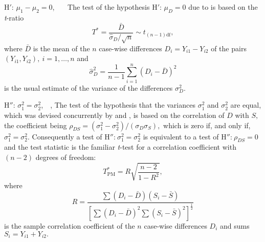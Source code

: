 \documentclass[a4]{beamer}
\begin{document}
\begin{frame}
 \begin{exampleblock}{H$'$: $\mu_1-\mu_2=0$,\ \ \ \cite{Student}} The test of the hypothesis H$'$: $\mu_D=0$ due to \cite{Student} is based on the \emph{t}-ratio
  \begin{equation}
   \label{StudentT} T^\ast = \frac{ \bar{D} }{ \hat{\sigma}_D/ \sqrt{n}} \sim t_{(n-1)\textrm{df}},
  \end{equation}
 where $\bar{D}$ is the mean of the $n$ case-wise differences $D_i=Y_{i1}-Y_{i2}$ of the pairs $(Y_{i1},Y_{i2}),\ i=1,\ldots,n$ and
  \[
   \hat{\sigma}^2_D = \frac{1}{ n-1} \sum_{i=1}^n (D_i-\bar{D})^2
  \]
 is the usual estimate of the variance of the differences $\sigma^2_D.$
 \end{exampleblock}

\begin{center}
\end{center}
\end{frame}


\begin{frame}
\begin{exampleblock}{ H$''$: $\sigma^2_1 =\sigma^2_2$,\ \ \cite{Pit39}, \cite{Morgan39}} The test of the hypothesis that the variances $\sigma^2_1$ and $\sigma^2_2$ are equal, which was devised concurrently by \cite{Pit39} and \cite{Morgan39}, is based on the correlation of $D$ with $S,$ the coefficient being $\rho_{DS} = (\sigma^2_1 -\sigma^2_2) / ( \sigma_D \sigma_S ),$ which is zero if, and only if, $\sigma^2_1 = \sigma^2_2.$ Consequently a test of $\textrm{H}''\textrm{:}\ \sigma^2_1 = \sigma^2_2$ is equivalent to a test of $\textrm{H}''\textrm{:}\ \rho_{DS}=0$ and the test statistic is the familiar {\it t}-test for a correlation coefficient with $(n-2)$ degrees of freedom:
\begin{equation}\label{tPitMorg}
T^*_\mathrm{PM} = R \sqrt{ \frac{n-2}{1-R^2} },
\end{equation}
where
\begin{equation}\label{Rcoeff}
R = \frac{ \sum (D_i-\bar{D})(S_i-\bar{S}) }{ [ \sum(D_i-\bar{D})^2 \sum (S_i-\bar{S})^2 ]^{\frac{1}{2}} }
\end{equation}
is the sample correlation coefficient of the $n$ case-wise differences $D_i$ and sums $S_i = Y_{i1} + Y_{i2}.$
\end{exampleblock}
\end{frame}
\end{document}

